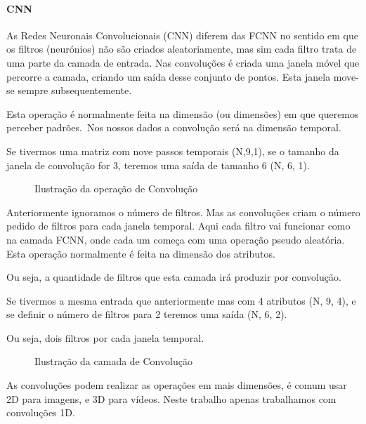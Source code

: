 \paragraph{CNN\label{se:cnn_sec}}
\text{ }  \par

As Redes Neuronais Convolucionais (\gls{CNN}) diferem das \gls{FCNN} no sentido em que os filtros (neurónios) não são criados aleatoriamente, mas sim cada filtro trata de uma parte da camada de entrada. Nas convoluções é criada uma janela móvel que percorre a camada, criando um saída desse conjunto de pontos. Esta janela move-se sempre subsequentemente.\par
Esta operação é normalmente feita na dimensão (ou dimensões) em que queremos perceber padrões.\
Nos nossos dados a convolução será na dimensão temporal.\par
Se tivermos uma matriz com nove passos temporais (N,9,1), se o tamanho da janela de convolução for 3, teremos uma saída de tamanho 6 (N, 6, 1).\par
\begin{figure}[H]
	\centering
	\resizebox{\linewidth}{!}{}
	\caption{Ilustração da operação de Convolução}
	\label{fig:conv_layer1D}
\end{figure}

Anteriormente ignoramos o número de filtros. Mas as convoluções criam o número pedido de filtros para cada janela temporal. Aqui cada filtro vai funcionar como na camada \gls{FCNN}, onde cada um começa com uma operação pseudo aleatória. Esta operação normalmente é feita na dimensão dos atributos.\par
Ou seja, a quantidade de filtros que esta camada irá produzir por convolução.\par
Se tivermos a mesma entrada que anteriormente mas com 4 atributos (N, 9, 4), e se definir o número de filtros para 2 teremos uma saída (N, 6, 2).\par
Ou seja, dois filtros por cada janela temporal.\par


\begin{figure}[H]
	\centering
	\resizebox{\linewidth}{!}{}
	\caption{Ilustração da camada de Convolução}
	\label{fig:conv_layer}
\end{figure}

As convoluções podem realizar as operações em mais dimensões, é comum usar 2D para imagens, e 3D para vídeos. Neste trabalho apenas trabalhamos com convoluções 1D.\par

